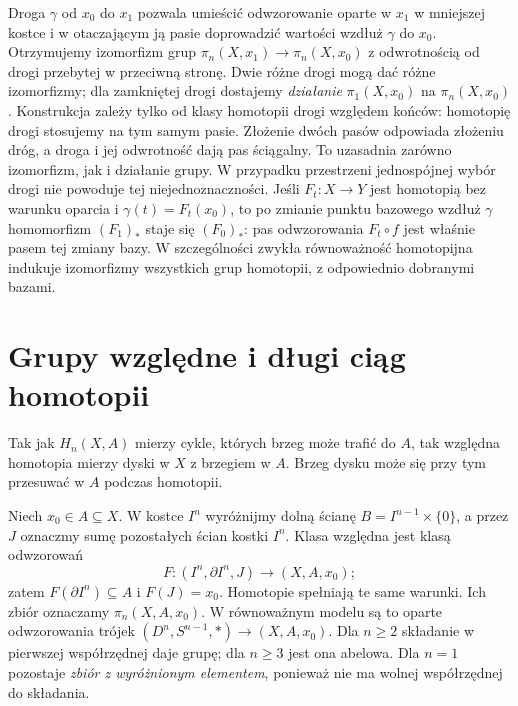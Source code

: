 \begin{uwaga}
Droga $\gamma$ od $x_0$ do $x_1$
pozwala umieścić odwzorowanie oparte w $x_1$
w mniejszej kostce i w otaczającym
ją pasie doprowadzić wartości
wzdłuż $\gamma$ do $x_0$.
Otrzymujemy izomorfizm grup
$\pi_n(X,x_1)\to\pi_n(X,x_0)$
z odwrotnością od drogi
przebytej w przeciwną stronę.
Dwie różne drogi mogą dać
różne izomorfizmy; dla zamkniętej
drogi dostajemy \emph{działanie}
$\pi_1(X,x_0)$ na $\pi_n(X,x_0)$.
Konstrukcja zależy tylko od klasy homotopii drogi względem końców:
homotopię drogi stosujemy na tym samym pasie. Złożenie dwóch pasów
odpowiada złożeniu dróg, a droga i jej odwrotność dają pas ściągalny.
To uzasadnia zarówno izomorfizm, jak i działanie grupy.
W przypadku przestrzeni jednospójnej wybór drogi
nie powoduje tej niejednoznaczności.
Jeśli $F_t:X\to Y$ jest homotopią bez warunku oparcia i
$\gamma(t)=F_t(x_0)$, to po zmianie punktu bazowego wzdłuż $\gamma$
homomorfizm $(F_1)_*$ staje się $(F_0)_*$: pas odwzorowania
$F_t\circ f$ jest właśnie pasem tej zmiany bazy.
W szczególności zwykła równoważność homotopijna indukuje
izomorfizmy wszystkich grup homotopii, z odpowiednio dobranymi bazami.
\end{uwaga}

\section{Grupy względne i długi ciąg homotopii}
\label{sec:pi-wzgledne}

Tak jak $H_n(X,A)$ mierzy cykle,
których brzeg może trafić do $A$,
tak względna homotopia mierzy
dyski w $X$ z brzegiem w $A$.
Brzeg dysku może się przy tym
przesuwać w $A$ podczas homotopii.

\begin{definicja}
\label{def:pi-wzgledne}
Niech $x_0\in A\subseteq X$.
W kostce $I^n$ wyróżnijmy
dolną ścianę $B=I^{n-1}\times\{0\}$,
a przez $J$ oznaczmy sumę
pozostałych ścian kostki $I^n$.
Klasa względna jest klasą odwzorowań
\[
 F:(I^n,\partial I^n,J)
       \longrightarrow(X,A,x_0);
\]
zatem $F(\partial I^n)\subseteq A$
i $F(J)=x_0$. Homotopie spełniają
te same warunki. Ich zbiór oznaczamy
$\pi_n(X,A,x_0)$.
W równoważnym modelu są to
oparte odwzorowania trójek
$(D^n,S^{n-1},*)\to(X,A,x_0)$.
Dla $n\geq2$ składanie w pierwszej
współrzędnej daje grupę; dla
$n\geq3$ jest ona abelowa.
Dla $n=1$ pozostaje \emph{zbiór
z wyróżnionym elementem},
ponieważ nie ma wolnej współrzędnej
do składania.
\end{definicja}

